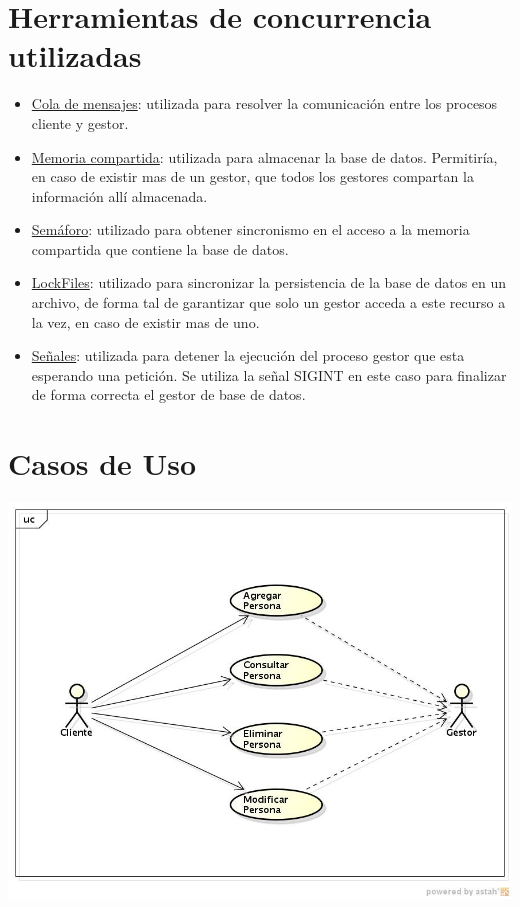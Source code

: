\documentclass[11pt]{article}
\begin{document}
\section{Herramientas de concurrencia utilizadas}
\begin{itemize}

 \item \underline{Cola de mensajes}: utilizada para resolver la comunicaci\'on entre los procesos cliente y gestor. \\
 \item \underline{Memoria compartida}: utilizada para almacenar la base de datos. Permitir\'ia, en caso de existir mas de un gestor, que todos los gestores 
compartan la informaci\'on all\'i almacenada.  \\
 \item \underline{Sem\'aforo}: utilizado para obtener sincronismo en el acceso a la memoria compartida que contiene la base de datos. \\
 \item \underline{LockFiles}: utilizado para sincronizar la persistencia de la base de datos en un archivo, de forma tal de garantizar que solo un
gestor acceda a este recurso a la vez, en caso de existir mas de uno. \\
 \item \underline{Se\~nales}: utilizada para detener la ejecuci\'on del proceso gestor que esta esperando una petición. Se utiliza la se\~nal SIGINT en este caso para finalizar de forma correcta el gestor de base de datos. \\
\end{itemize}



\section{Casos de Uso}


\begin{center}
\includegraphics[scale=0.65]{CasosUsoCliente} 
\end{center}
\end{document}
